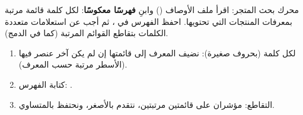 \begin{statement}
محرك بحث المتجر: اقرأ ملف الأوصاف  () وابنِ \textbf{فهرسًا معكوسًا}: لكل كلمة قائمة مرتبة بمعرفات المنتجات التي تحتويها. احفظ الفهرس في ، ثم أجب عن استعلامات \textbf{} متعددة الكلمات بتقاطع القوائم المرتبة (كما في الدمج).
\end{statement}
\begin{stepsbox}\begin{enumerate}
\item لكل كلمة (بحروف صغيرة): نضيف المعرف إلى قائمتها إن لم يكن آخر عنصر فيها (الأسطر مرتبة حسب المعرف).
\item كتابة الفهرس: .
\item التقاطع: مؤشران على قائمتين مرتبتين، نتقدم بالأصغر، ونحتفظ بالمتساوي.
\end{enumerate}\end{stepsbox}
